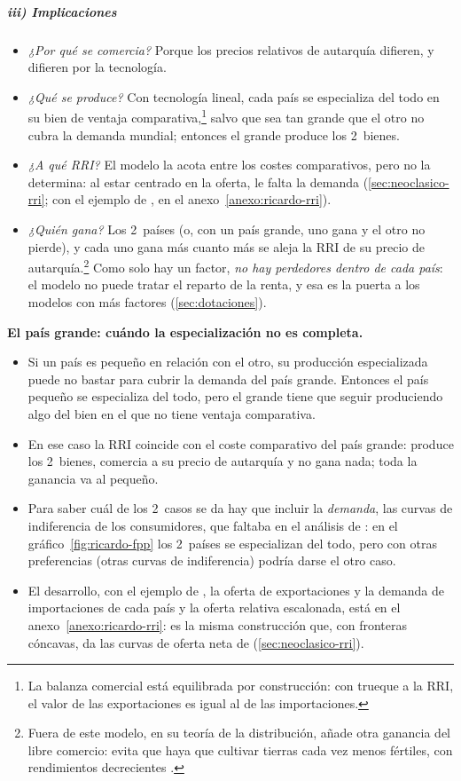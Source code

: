 \documentclass[11pt]{article}
\begin{document}
\subparagraph{iii) Implicaciones}

\begin{itemize}
\item \emph{¿Por qué se comercia?} Porque los precios relativos de autarquía difieren, y difieren por la tecnología.
\item \emph{¿Qué se produce?} Con tecnología lineal, cada país se especializa del todo en su bien de ventaja comparativa,\footnote{La balanza comercial está equilibrada por construcción: con trueque a la RRI, el valor de las exportaciones es igual al de las importaciones.} salvo que sea tan grande que el otro no cubra la demanda mundial; entonces el grande produce los 2~bienes.
\item \emph{¿A qué RRI?} El modelo la acota entre los costes comparativos, pero no la determina: al estar centrado en la oferta, le falta la demanda (\ref{sec:neoclasico-rri}; con el ejemplo de , en el anexo~\ref{anexo:ricardo-rri}).
\item \emph{¿Quién gana?} Los 2~países (o, con un país grande, uno gana y el otro no pierde), y cada uno gana más cuanto más se aleja la RRI de su precio de autarquía.\footnote{Fuera de este modelo, en su teoría de la distribución,  añade otra ganancia del libre comercio: evita que haya que cultivar tierras cada vez menos fértiles, con rendimientos decrecientes .} Como solo hay un factor, \emph{no hay perdedores dentro de cada país}: el modelo no puede tratar el reparto de la renta, y esa es la puerta a los modelos con más factores (\ref{sec:dotaciones}).
\end{itemize}
\begin{anotaciones}
\textbf{El país grande: cuándo la especialización no es completa.}
\begin{itemize}
\item Si un país es pequeño en relación con el otro, su producción especializada puede no bastar para cubrir la demanda del país grande. Entonces el país pequeño se especializa del todo, pero el grande tiene que seguir produciendo algo del bien en el que no tiene ventaja comparativa.
\item En ese caso la RRI coincide con el coste comparativo del país grande: produce los 2~bienes, comercia a su precio de autarquía y no gana nada; toda la ganancia va al pequeño.
\item Para saber cuál de los 2~casos se da hay que incluir la \emph{demanda}, las curvas de indiferencia de los consumidores, que faltaba en el análisis de : en el gráfico~\ref{fig:ricardo-fpp} los 2~países se especializan del todo, pero con otras preferencias (otras curvas de indiferencia) podría darse el otro caso.
\item El desarrollo, con el ejemplo de , la oferta de exportaciones y la demanda de importaciones de cada país y la oferta relativa escalonada, está en el anexo~\ref{anexo:ricardo-rri}: es la misma construcción que, con fronteras cóncavas, da las curvas de oferta neta de  (\ref{sec:neoclasico-rri}).
\end{itemize}
\end{anotaciones}
\end{document}
